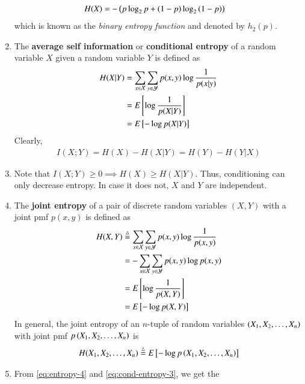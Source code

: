 \documentclass[journal,12pt,twocolumn]{IEEEtran}
\renewcommand\thesection{\arabic{section}}
\begin{document}
\begin{enumerate}[label=\thesection.\arabic*, ref=\thesection.\theenumi]
    \begin{align}
        H(X) &= -\left(p\log_2p + (1 - p)\log_2\left(1 - p\right)\right)
        \label{eq:bin-entropy-func}
    \end{align}
    which is known as the \textit{binary entropy function} and denoted by 
    $h_2(p)$.
    \item The \textbf{average self information} or \textbf{conditional entropy} 
    of a random variable $X$ given a random variable $Y$ is defined as
    \begin{align}
        H(X|Y) &= \sum_{x\in\mathcal{X}}\sum_{y\in\mathcal{Y}}p(x,y)\log\frac{1}{p(x|y)} \label{eq:cond-entropy-1} \\
        &= E{}\left[\log\frac{1}{p(X|Y)}\right] \label{eq:cond-entropy-2} \\
        &= E{}\left[-\log p(X|Y)\right] \label{eq:cond-entropy-3}
    \end{align}
    Clearly,
    \begin{align}
        I(X;Y) = H(X) - H(X|Y) = H(Y) - H(Y|X)
        \label{eq:cond-mutual-self-entropy}
    \end{align}
    \item Note that $I(X;Y) \ge 0 \implies H(X) \ge H(X|Y)$. Thus, conditioning 
    can only decrease entropy. In case it does not, $X$ and $Y$ are 
    independent.
    \item The \textbf{joint entropy} of a pair of discrete random variables 
    $(X,Y)$ with a joint pmf $p(x,y)$ is defined as
    \begin{align}
        H(X,Y) &\stackrel{\triangle}{=} \sum_{x\in\mathcal{X}}\sum_{y\in\mathcal{Y}}p(x,y)\log\frac{1}{p(x,y)} \label{eq:joint-entropy-1} \\
        &= -\sum_{x\in\mathcal{X}}\sum_{y\in\mathcal{Y}}p(x,y)\log{p(x,y)} \label{eq:joint-entropy-2} \\
        &= E{}\left[\log\frac{1}{p(X,Y)}\right] \label{eq:joint-entropy-3} \\
        &= E{}\left[-\log{p(X,Y)}\right] \label{eq:joint-entropy-4}
    \end{align}
    In general, the joint entropy of an $n$-tuple of random variables 
    $\left(X_1, X_2, \ldots, X_n\right)$ with joint pmf $p\left(X_1,X_2,\ldots,X_n\right)$ 
    is 
    \begin{align}
        H(X_1,X_2,\ldots,X_n) \stackrel{\triangle}{=} E{}\left[-\log{p\ensuremath{\left(X_1,X_2,\ldots,X_n\right)}}\right]
        \label{eq:joint-entropy-gen}
    \end{align}
    \item From \eqref{eq:entropy-4} and \eqref{eq:cond-entropy-3}, we get the 

\end{enumerate}
\end{document}
